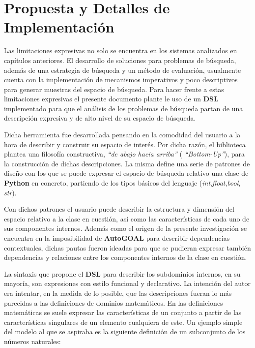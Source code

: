 \chapter{Propuesta y Detalles de Implementación}\label{chapter:proposal}

Las limitaciones expresivas no solo se encuentra en los sistemas analizados
en capítulos anteriores. El desarrollo de soluciones para problemas de búsqueda,
además de una estrategia de búsqueda y un método de evaluación, usualmente cuenta
con la implementación de mecanismos imperativos y poco descriptivos para generar
muestras del espacio de búsqueda. Para hacer frente a estas limitaciones expresivas
el presente documento plante le uso de un {\bf DSL} implementado para que el análisis de
los problemas de búsqueda partan de una descripción expresiva y de alto nivel de su
espacio de búsqueda.

Dicha herramienta fue desarrollada pensando en la comodidad del usuario a la hora de
describir y construir su espacio de interés. Por dicha razón, el biblioteca plantea
una filosofía constructiva, {\it “de abajo hacia arriba”} ({ \it “Bottom-Up”}), para la
construcción de dichas descripciones. La misma define una serie de patrones de diseño
con los que se puede expresar el espacio de búsqueda relativo una clase de {\bf Python} en
concreto, partiendo de los tipos básicos del lenguaje ({\it int},{\it float},{\it bool},
{\it str}).

Con dichos patrones el usuario puede describir la estructura y dimensión del espacio
relativo a la clase en cuestión, así como las características de cada uno de sus
componentes internos. Además como el origen de la presente investigación se encuentra
en la imposibilidad de {\bf AutoGOAL} para describir dependencias contextuales, dichas pautas
fueron ideadas para que se pudieran expresar también dependencias y relaciones entre los
componentes internos de la clase en cuestión.

La sintaxis que propone el {\bf DSL} para describir los subdominios internos, en su mayoría,
son expresiones con estilo funcional y declarativo. La intención del autor era intentar,
en la medida de lo posible, que las descripciones fueran lo más parecidas a las definiciones
de dominios matemáticos. En las definiciones matemáticas se suele expresar las características
de un conjunto a partir de las características singulares de un elemento cualquiera de este.
Un ejemplo simple del modelo al que se aspiraba es la siguiente definición de un subconjunto de
los números naturales:

